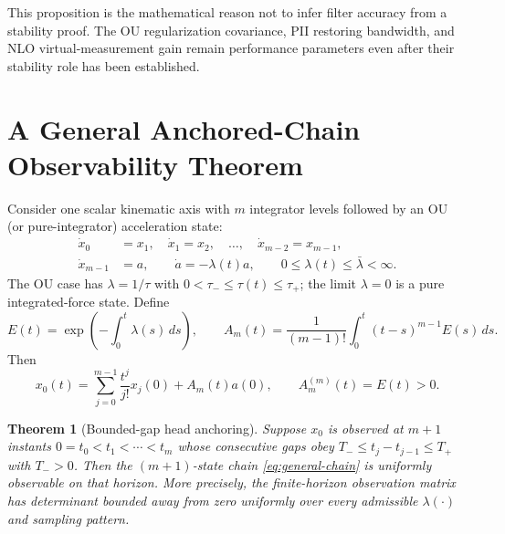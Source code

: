 \documentclass[conference]{IEEEtran}
\newtheorem{theorem}{Theorem}
\theoremstyle{remark}
\begin{document}
This proposition is the mathematical reason not to infer filter accuracy from
a stability proof.  The OU regularization covariance, PII restoring bandwidth,
and NLO virtual-measurement gain remain performance parameters even after their
stability role has been established.

\section{A General Anchored-Chain Observability Theorem}
\label{sec:chain-theorem}

Consider one scalar kinematic axis with $m$ integrator levels followed by an OU
(or pure-integrator) acceleration state:
\begin{align}
 \dot x_0&=x_1,\quad \dot x_1=x_2,\quad\ldots,\quad
 \dot x_{m-2}=x_{m-1},\\
 \dot x_{m-1}&=a,\qquad \dot a=-\lambda(t)a,
 \qquad 0\le\lambda(t)\le\bar\lambda<\infty.
 \label{eq:general-chain}
\end{align}
The OU case has $\lambda=1/\tau$ with $0<\tau_-\le\tau(t)\le\tau_+$;
the limit $\lambda=0$ is a pure integrated-force state.  Define
\begin{equation}
 E(t)=\exp\!\left(-\int_0^t\lambda(s)\,ds\right),
 \qquad
 A_m(t)=\frac{1}{(m-1)!}\int_0^t(t-s)^{m-1}E(s)\,ds .
 \label{eq:Am-def}
\end{equation}
Then
\begin{equation}
 x_0(t)=\sum_{j=0}^{m-1}\frac{t^j}{j!}x_j(0)+A_m(t)a(0),
 \qquad A_m^{(m)}(t)=E(t)>0.
 \label{eq:head-solution}
\end{equation}

\begin{theorem}[Bounded-gap head anchoring]
\label{thm:head-anchor}
Suppose $x_0$ is observed at $m+1$ instants
$0=t_0<t_1<\cdots<t_m$ whose consecutive gaps obey
$T_-\le t_j-t_{j-1}\le T_+$ with $T_->0$.  Then the
$(m+1)$-state chain \eqref{eq:general-chain} is uniformly observable on that
horizon.  More precisely, the finite-horizon observation matrix has determinant
bounded away from zero uniformly over every admissible $\lambda(\cdot)$ and
sampling pattern.
\end{theorem}
\end{document}
